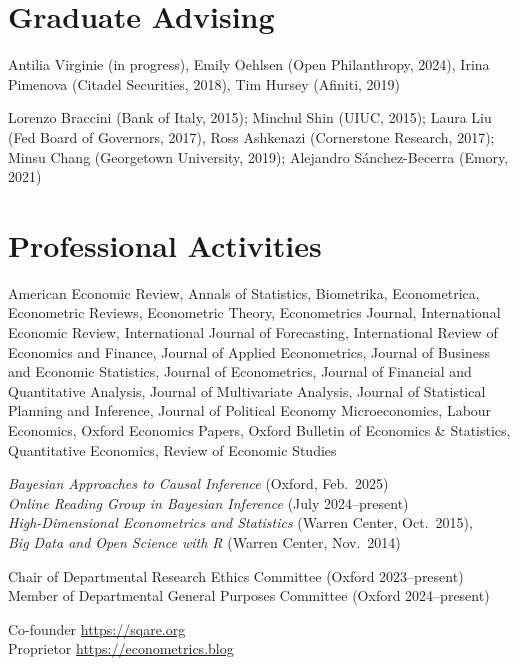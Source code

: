 \documentclass[line,overlapped]{myres}
\begin{document}
\begin{resume}
\section{\sc Graduate Advising}
\begin{description}[style=multiline,leftmargin=3cm,font=\normalfont]
  \item[Main or Joint Supervisor:] Antilia Virginie (in progress), Emily Oehlsen (Open Philanthropy, 2024), Irina Pimenova (Citadel Securities, 2018), Tim Hursey (Afiniti, 2019)
  \item[Committee \\ Member:] Lorenzo Braccini (Bank of Italy, 2015); Minchul Shin (UIUC, 2015); Laura Liu (Fed Board of Governors, 2017), Ross Ashkenazi (Cornerstone Research, 2017); Minsu Chang (Georgetown University, 2019); Alejandro S\'{a}nchez-Becerra (Emory, 2021)
\end{description}


\section{\sc Professional Activities}

\begin{description}[style=multiline,leftmargin=3cm,font=\normalfont]
  \item[Refereeing:] American Economic Review, Annals of Statistics, Biometrika, Econometrica, Econometric Reviews, Econometric Theory, Econometrics Journal, International Economic Review, International Journal of Forecasting, International Review of Economics and Finance, Journal of Applied Econometrics, Journal of Business and Economic Statistics, Journal of Econometrics, Journal of Financial and Quantitative Analysis, Journal of Multivariate Analysis, Journal of Statistical Planning and Inference, Journal of Political Economy Microeconomics, Labour Economics, Oxford Economics Papers, Oxford Bulletin of Economics \& Statistics, Quantitative Economics, Review of Economic Studies 
  \item[Workshops \\ Organized:]
    \emph{Bayesian Approaches to Causal Inference} (Oxford, Feb.\ 2025)\\
    \emph{Online Reading Group in Bayesian Inference} (July 2024--present)\\
    \emph{High-Dimensional Econometrics and Statistics} (Warren Center, Oct.\ 2015), \\
    \emph{Big Data and Open Science with R} (Warren Center, Nov.\ 2014)
  \item[Service:] Chair of Departmental Research Ethics Committee (Oxford 2023--present)\\ Member of Departmental General Purposes Committee (Oxford 2024--present) 
  \item[Miscellaneous:] Co-founder \url{https://sqare.org}\\ Proprietor \url{https://econometrics.blog}
\end{description}




\end{resume}
\end{document}
